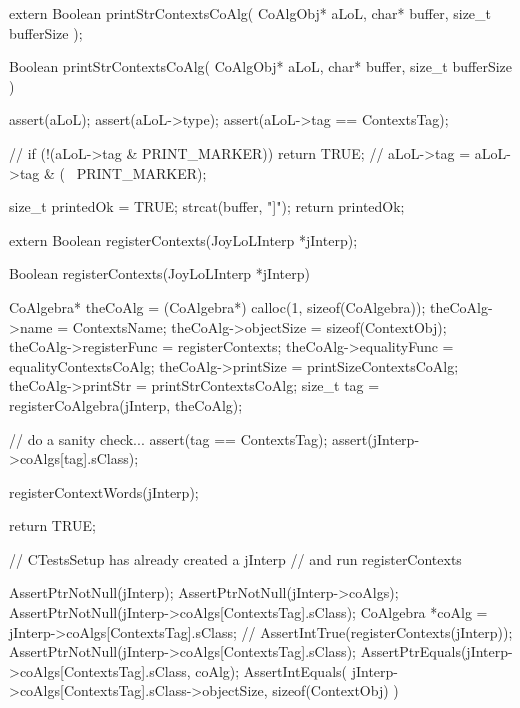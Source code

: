 \startCHeader
extern Boolean printStrContextsCoAlg(
  CoAlgObj* aLoL,
  char* buffer,
  size_t bufferSize
);
\stopCHeader

\startCCode
Boolean printStrContextsCoAlg(
  CoAlgObj* aLoL,
  char* buffer,
  size_t bufferSize
) {
  assert(aLoL);
  assert(aLoL->type);
  assert(aLoL->tag == ContextsTag);

//  if (!(aLoL->tag & PRINT_MARKER)) return TRUE;
//  aLoL->tag = aLoL->tag & (~ PRINT_MARKER);

  size_t printedOk = TRUE;
  strcat(buffer, "\n[");
  strcat(buffer, asName(aLoL));
  strcat(buffer, "[ ");
  lolPrintStr(printedOk, asData(aLoL),
              "d:( ", ") ", buffer, bufferSize);
  lolPrintStr(printedOk, asCommand(aLoL),
              "c:( ", ") ", buffer, bufferSize);
  lolPrintStr(printedOk, asProcess(aLoL),
              "p:( ", ") ", buffer, bufferSize);
  lolPrintStr(printedOk, asMessages(aLoL),
              "m:( ", ") ", buffer, bufferSize);
  lolPrintStr(printedOk, asListeners(aLoL),
              "l:( ", ") ", buffer, bufferSize);
  strcat(buffer, " ]]\n");
  return printedOk;
}
\stopCCode

\startTestSuite[registerContexts]

\startCHeader
extern Boolean registerContexts(JoyLoLInterp *jInterp);
\stopCHeader
{}

\startCCode
Boolean registerContexts(JoyLoLInterp *jInterp) {
  CoAlgebra* theCoAlg    = (CoAlgebra*) calloc(1, sizeof(CoAlgebra));
  theCoAlg->name         = ContextsName;
  theCoAlg->objectSize   = sizeof(ContextObj);
  theCoAlg->registerFunc = registerContexts;
  theCoAlg->equalityFunc = equalityContextsCoAlg;
  theCoAlg->printSize    = printSizeContextsCoAlg;
  theCoAlg->printStr     = printStrContextsCoAlg;
  size_t tag = registerCoAlgebra(jInterp, theCoAlg);

  // do a sanity check...
  assert(tag == ContextsTag);
  assert(jInterp->coAlgs[tag].sClass);
  
  registerContextWords(jInterp);
  
  return TRUE;
}
\stopCCode


\startCTest
  // CTestsSetup has already created a jInterp
  // and run registerContexts
  
  AssertPtrNotNull(jInterp);
  AssertPtrNotNull(jInterp->coAlgs);
  AssertPtrNotNull(jInterp->coAlgs[ContextsTag].sClass);
  CoAlgebra *coAlg = jInterp->coAlgs[ContextsTag].sClass;
//  AssertIntTrue(registerContexts(jInterp));
  AssertPtrNotNull(jInterp->coAlgs[ContextsTag].sClass);
  AssertPtrEquals(jInterp->coAlgs[ContextsTag].sClass, coAlg);
  AssertIntEquals(
    jInterp->coAlgs[ContextsTag].sClass->objectSize,
    sizeof(ContextObj)
  )
\stopCTest

